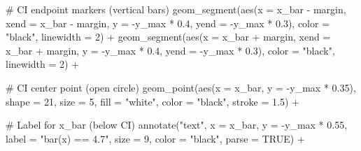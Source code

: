 \documentclass[
  letterpaper,
  DIV=11,
  numbers=noendperiod]{scrreprt}
\newenvironment{Shaded}{\begin{snugshade}}{\end{snugshade}}
\newcommand{\AttributeTok}[1]{\textcolor[rgb]{0.40,0.45,0.13}{#1}}
\newcommand{\CommentTok}[1]{\textcolor[rgb]{0.37,0.37,0.37}{#1}}
\newcommand{\ConstantTok}[1]{\textcolor[rgb]{0.56,0.35,0.01}{#1}}
\newcommand{\DecValTok}[1]{\textcolor[rgb]{0.68,0.00,0.00}{#1}}
\newcommand{\FloatTok}[1]{\textcolor[rgb]{0.68,0.00,0.00}{#1}}
\newcommand{\FunctionTok}[1]{\textcolor[rgb]{0.28,0.35,0.67}{#1}}
\newcommand{\NormalTok}[1]{\textcolor[rgb]{0.00,0.23,0.31}{#1}}
\newcommand{\SpecialCharTok}[1]{\textcolor[rgb]{0.37,0.37,0.37}{#1}}
\newcommand{\StringTok}[1]{\textcolor[rgb]{0.13,0.47,0.30}{#1}}
\begin{document}
\begin{Shaded}
\begin{Highlighting}[]
  \CommentTok{\# CI endpoint markers (vertical bars)}
  \FunctionTok{geom\_segment}\NormalTok{(}\FunctionTok{aes}\NormalTok{(}\AttributeTok{x =}\NormalTok{ x\_bar }\SpecialCharTok{{-}}\NormalTok{ margin, }\AttributeTok{xend =}\NormalTok{ x\_bar }\SpecialCharTok{{-}}\NormalTok{ margin,}
                   \AttributeTok{y =} \SpecialCharTok{{-}}\NormalTok{y\_max }\SpecialCharTok{*} \FloatTok{0.4}\NormalTok{, }\AttributeTok{yend =} \SpecialCharTok{{-}}\NormalTok{y\_max }\SpecialCharTok{*} \FloatTok{0.3}\NormalTok{),}
               \AttributeTok{color =} \StringTok{"black"}\NormalTok{, }\AttributeTok{linewidth =} \DecValTok{2}\NormalTok{) }\SpecialCharTok{+}
  \FunctionTok{geom\_segment}\NormalTok{(}\FunctionTok{aes}\NormalTok{(}\AttributeTok{x =}\NormalTok{ x\_bar }\SpecialCharTok{+}\NormalTok{ margin, }\AttributeTok{xend =}\NormalTok{ x\_bar }\SpecialCharTok{+}\NormalTok{ margin,}
                   \AttributeTok{y =} \SpecialCharTok{{-}}\NormalTok{y\_max }\SpecialCharTok{*} \FloatTok{0.4}\NormalTok{, }\AttributeTok{yend =} \SpecialCharTok{{-}}\NormalTok{y\_max }\SpecialCharTok{*} \FloatTok{0.3}\NormalTok{),}
               \AttributeTok{color =} \StringTok{"black"}\NormalTok{, }\AttributeTok{linewidth =} \DecValTok{2}\NormalTok{) }\SpecialCharTok{+}
  
  \CommentTok{\# CI center point (open circle)}
  \FunctionTok{geom\_point}\NormalTok{(}\FunctionTok{aes}\NormalTok{(}\AttributeTok{x =}\NormalTok{ x\_bar, }\AttributeTok{y =} \SpecialCharTok{{-}}\NormalTok{y\_max }\SpecialCharTok{*} \FloatTok{0.35}\NormalTok{), }
             \AttributeTok{shape =} \DecValTok{21}\NormalTok{, }\AttributeTok{size =} \DecValTok{5}\NormalTok{, }\AttributeTok{fill =} \StringTok{"white"}\NormalTok{, }\AttributeTok{color =} \StringTok{"black"}\NormalTok{, }\AttributeTok{stroke =} \FloatTok{1.5}\NormalTok{) }\SpecialCharTok{+}
  
  \CommentTok{\# Label for x\_bar (below CI)}
  \FunctionTok{annotate}\NormalTok{(}\StringTok{"text"}\NormalTok{, }\AttributeTok{x =}\NormalTok{ x\_bar, }\AttributeTok{y =} \SpecialCharTok{{-}}\NormalTok{y\_max }\SpecialCharTok{*} \FloatTok{0.55}\NormalTok{, }
           \AttributeTok{label =} \StringTok{"bar(x) == 4.7"}\NormalTok{,}
           \AttributeTok{size =} \DecValTok{9}\NormalTok{, }\AttributeTok{color =} \StringTok{"black"}\NormalTok{, }\AttributeTok{parse =} \ConstantTok{TRUE}\NormalTok{) }\SpecialCharTok{+}
  

\end{Highlighting}
\end{Shaded}
\end{document}
